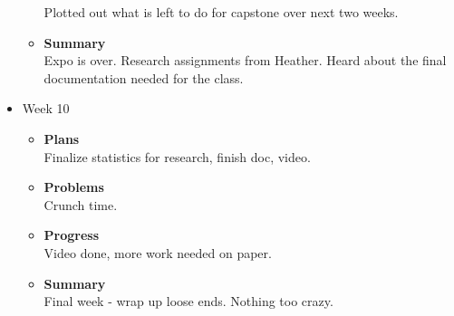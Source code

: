 \begin{itemize}
\begin{itemize}
				Plotted out what is left to do for capstone over next two weeks.
				\item \textbf{Summary} \\
				Expo is over. Research assignments from Heather. Heard about the final documentation needed for the class.
			\end{itemize}
		\item{Week 10}
			\begin{itemize}
				\item \textbf{Plans} \\
				Finalize statistics for research, finish doc, video.
				\item \textbf{Problems} \\
				Crunch time.
				\item \textbf{Progress} \\
				Video done, more work needed on paper.
				\item \textbf{Summary} \\
				Final week - wrap up loose ends. Nothing too crazy.
			\end{itemize}
	\end{itemize}
\pagebreak

